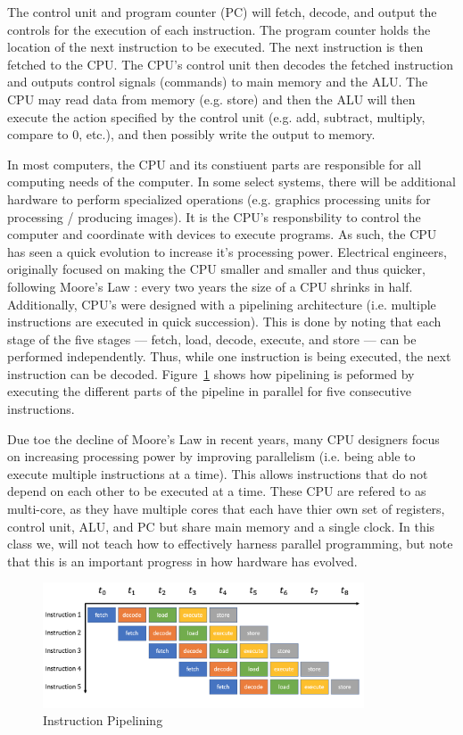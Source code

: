 The control unit and program counter (PC) will fetch, decode, and output the
controls for the execution of each instruction. The program counter holds the
location of the next instruction to be executed. The next instruction is then
fetched to the CPU. The CPU's control unit then decodes the fetched instruction
and outputs control signals (commands) to main memory and the ALU. The CPU may
read data from memory (e.g. store) and then the ALU will then execute the action
specified by the control unit (e.g. add, subtract, multiply, compare to 0, etc.),
and then possibly write the output to memory.

In most computers, the CPU and its constiuent parts are responsible for all
computing needs of the computer. In some select systems, there will be additional
hardware to perform specialized operations (e.g. graphics processing units for
processing / producing images). It is the CPU's responsbility to control the
computer and coordinate with devices to execute programs. As such, the CPU
has seen a quick evolution to increase it's processing power. Electrical
engineers, originally focused on making the CPU smaller and smaller and thus
quicker, following Moore's Law : every two years the size of a CPU shrinks
in half. Additionally, CPU's were designed with a pipelining architecture
(i.e. multiple instructions are executed in quick succession). This is done
by noting that each stage of the five stages --- fetch, load,  decode, execute,
and store --- can be performed independently. Thus, while one instruction is
being executed, the next instruction can be decoded. Figure~\ref{fig:hardware:pipeline}
shows how pipelining is peformed by executing the different parts of the pipeline
in parallel for five consecutive instructions.

Due toe the decline of Moore's Law in recent years, many CPU designers focus on
increasing processing power by improving parallelism (i.e. being able to execute
multiple instructions at a time). This allows instructions that do not depend
on each other to be executed at a time. These CPU are refered to as multi-core,
as they have multiple cores that each have thier own set of registers, control unit,
ALU, and PC but share main memory and a single clock. In this class we, will not
teach how to effectively harness parallel programming, but note that this is
an important progress in how hardware has evolved.

\begin{figure}
	\centering
	\includegraphics[width=0.85\textwidth]{images/pipeline.png}
	\caption{Instruction Pipelining}
	\label{fig:hardware:pipeline}
\end{figure}



